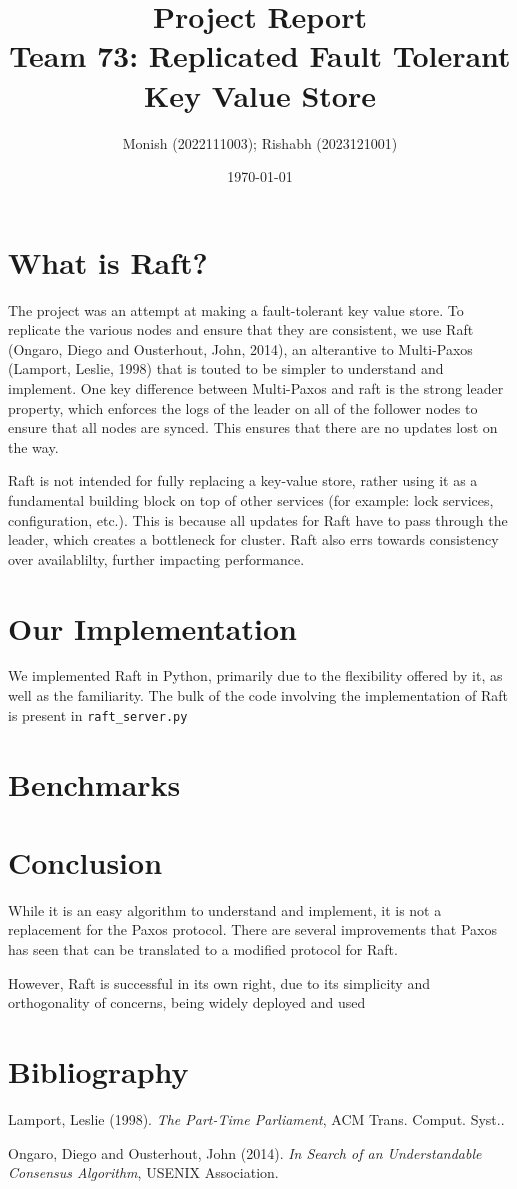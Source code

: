 \documentclass[11pt]{article}
\author{Monish (2022111003); Rishabh (2023121001)}
\date{\today}
\title{Project Report\\\medskip
\large Team 73: Replicated Fault Tolerant Key Value Store}
\begin{document}
\maketitle
\tableofcontents

\section{What is Raft?}
\label{sec:orge266d73}
The project was an attempt at making a fault-tolerant key value store. To replicate the various nodes and ensure that they are consistent, we use Raft (Ongaro, Diego and Ousterhout, John, 2014), an alterantive to Multi-Paxos (Lamport, Leslie, 1998) that is touted to be simpler to understand and implement. One key difference between Multi-Paxos and raft is the strong leader property, which enforces the logs of the leader on all of the follower nodes to ensure that all nodes are synced. This ensures that there are no updates lost on the way.

Raft is not intended for fully replacing a key-value store, rather using it as a fundamental building block on top of other services (for example: lock services, configuration, etc.). This is because all updates for Raft have to pass through the leader, which creates a bottleneck for cluster. Raft also errs towards consistency over availablilty, further impacting performance.
\section{Our Implementation}
\label{sec:org0e36952}
We implemented Raft in Python, primarily due to the flexibility offered by it, as well as the familiarity. The bulk of the code involving the implementation of Raft is present in \texttt{raft\_server.py}
\section{Benchmarks}
\label{sec:org71dbd9c}

\section{Conclusion}
\label{sec:org28928df}
While it is an easy algorithm to understand and implement, it is not a replacement for the Paxos protocol. There are several improvements that Paxos has seen that can be translated to a modified protocol for Raft.

However, Raft is successful in its own right, due to its simplicity and orthogonality of concerns, being widely deployed and used
\section{Bibliography}
\label{sec:orgc8975df}
\noindent
Lamport, Leslie (1998). \emph{The Part-Time Parliament}, ACM Trans. Comput. Syst..

\noindent
Ongaro, Diego and Ousterhout, John (2014). \emph{In Search of an Understandable Consensus Algorithm}, USENIX Association.
\end{document}
